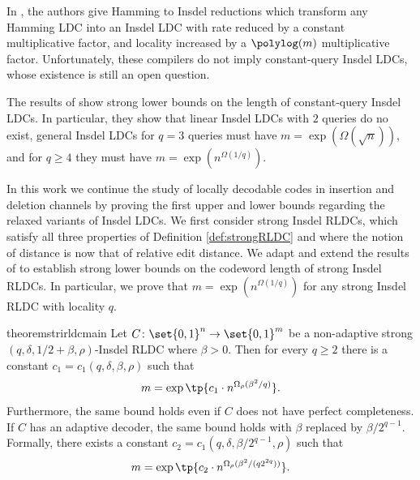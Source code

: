 In \cite{Ostrovsky-InsdelLDC-Compiler,BlockBGKZ20}, the authors give Hamming to Insdel reductions which transform any Hamming LDC into an Insdel LDC with rate reduced by a constant multiplicative factor, and locality increased by a  $\polylog(m)$ multiplicative factor. Unfortunately, these compilers do not imply constant-query Insdel LDCs, whose existence is still an open question.


 The results of \cite{blocki2021exponential} show  strong lower bounds on the length of constant-query Insdel LDCs. In particular, they show that  linear Insdel LDCs with $2$  queries do no exist,  general Insdel LDCs for $q= 3$ queries must have  $m=\exp(\Omega(\sqrt{n}))$, and for $q\geq 4$ they must have $m=\exp(n^{\Omega(1/q)}).$ 
 
 
 In this work we continue the study of locally decodable codes in insertion and deletion channels by proving the first upper and lower bounds regarding the relaxed variants of Insdel LDCs. %
 We first consider strong Insdel RLDCs, which satisfy all three properties of Definition \ref{def:strongRLDC} and where the notion of distance is now that of relative edit distance. We adapt and extend the results of \cite{blocki2021exponential} to establish strong lower bounds on the codeword length of strong Insdel RLDCs. In particular, we prove that $m= \exp(n^{\Omega(1/q)})$ for any strong Insdel RLDC with locality $q$.
 
 
 \begin{restatable}{theorem}{strirldcmain} \label{thm:main-sinsdel RLDC}
	Let $C \colon \set{0,1}^n \rightarrow \set{0,1}^m$ be a non-adaptive strong $(q,\delta,1/2+\beta,\rho)$-Insdel RLDC where $\beta>0$. Then for every $q\ge 2$ there is a constant $c_1=c_1(q,\delta,\beta,\rho)$ such that  
	\begin{align*}
	    m = \exp\tp{c_1\cdot n^{\Omega_{\rho}(\beta^2/q)}}.
	\end{align*}
	Furthermore, the same bound holds even if $C$ does not have perfect completeness. If $C$ has an adaptive decoder, the same bound holds with $\beta$ replaced by $\beta/2^{q-1}$. Formally, there exists a constant $c_2=c_1(q,\delta,\beta/2^{q-1},\rho)$ such that
	\begin{align*}
	    m = \exp\tp{c_2\cdot n^{\Omega_{\rho}(\beta^2/(q2^{2q}))}}.
	\end{align*}
\end{restatable} 

